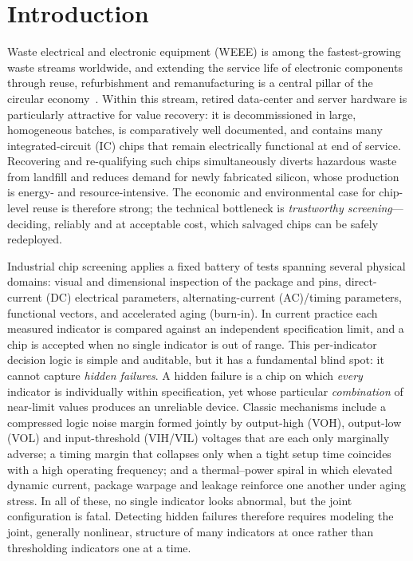 \documentclass[electronics,article,submit,pdftex,moreauthors]{Definitions/mdpi}
\begin{document}
\section{Introduction}
Waste electrical and electronic equipment (WEEE) is among the fastest-growing waste streams worldwide, and extending the service life of electronic components through reuse, refurbishment and remanufacturing is a central pillar of the circular economy~\cite{deoliveiraneto2023weee}. Within this stream, retired data-center and server hardware is particularly attractive for value recovery: it is decommissioned in large, homogeneous batches, is comparatively well documented, and contains many integrated-circuit (IC) chips that remain electrically functional at end of service. Recovering and re-qualifying such chips simultaneously diverts hazardous waste from landfill and reduces demand for newly fabricated silicon, whose production is energy- and resource-intensive. The economic and environmental case for chip-level reuse is therefore strong; the technical bottleneck is \emph{trustworthy screening}---deciding, reliably and at acceptable cost, which salvaged chips can be safely redeployed.

Industrial chip screening applies a fixed battery of tests spanning several physical domains: visual and dimensional inspection of the package and pins, direct-current (DC) electrical parameters, alternating-current (AC)/timing parameters, functional vectors, and accelerated aging (burn-in). In current practice each measured indicator is compared against an independent specification limit, and a chip is accepted when no single indicator is out of range. This per-indicator decision logic is simple and auditable, but it has a fundamental blind spot: it cannot capture \emph{hidden failures}. A hidden failure is a chip on which \emph{every} indicator is individually within specification, yet whose particular \emph{combination} of near-limit values produces an unreliable device. Classic mechanisms include a compressed logic noise margin formed jointly by output-high (VOH), output-low (VOL) and input-threshold (VIH/VIL) voltages that are each only marginally adverse; a timing margin that collapses only when a tight setup time coincides with a high operating frequency; and a thermal--power spiral in which elevated dynamic current, package warpage and leakage reinforce one another under aging stress. In all of these, no single indicator looks abnormal, but the joint configuration is fatal. Detecting hidden failures therefore requires modeling the joint, generally nonlinear, structure of many indicators at once rather than thresholding indicators one at a time.
\end{document}
